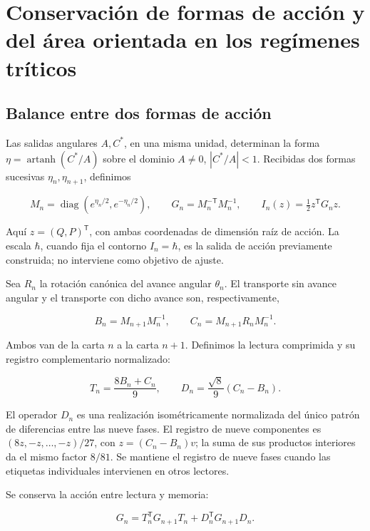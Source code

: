 \section{Conservación de formas de acción y del área orientada en los regímenes tríticos}
\label{nuclear:8}
\subsection{Balance entre dos formas de acción}

Las salidas angulares \(A,C^*\), en una misma unidad, determinan la forma \(\eta=\operatorname{artanh}(C^*/A)\) sobre el dominio \(A\ne0\), \(|C^*/A|<1\). Recibidas dos formas sucesivas \(\eta_n,\eta_{n+1}\), definimos

\[
M_n=\operatorname{diag}(e^{\eta_n/2},e^{-\eta_n/2}),\qquad
G_n=M_n^{-\mathsf T}M_n^{-1},\qquad
I_n(z)=\tfrac12z^\mathsf TG_nz.
\]

Aquí \(z=(Q,P)^\mathsf T\), con ambas coordenadas de dimensión raíz de acción. La escala \(\hbar\), cuando fija el contorno \(I_n=\hbar\), es la salida de acción previamente construida; no interviene como objetivo de ajuste.

Sea \(R_n\) la rotación canónica del avance angular \(\theta_n\). El transporte sin avance angular y el transporte con dicho avance son, respectivamente,

\begin{equation}
B_n=M_{n+1}M_n^{-1},\qquad
C_n=M_{n+1}R_nM_n^{-1}.
\label{nuc08:eq:1}
\end{equation}

Ambos van de la carta \(n\) a la carta \(n+1\). Definimos la lectura comprimida y su registro complementario normalizado:

\begin{equation}
T_n=\frac{8B_n+C_n}{9},\qquad
D_n=\frac{\sqrt8}{9}(C_n-B_n).
\label{nuc08:eq:2}
\end{equation}

El operador \(D_n\) es una realización isométricamente normalizada del único patrón de diferencias entre las nueve fases. El registro de nueve componentes es \((8z,-z,\ldots,-z)/27\), con \(z=(C_n-B_n)v\); la suma de sus productos interiores da el mismo factor \(8/81\). Se mantiene el registro de nueve fases cuando las etiquetas individuales intervienen en otros lectores.

\begin{theorem}
Se conserva la acción entre lectura y memoria:

\begin{equation}
\boxed{G_n=T_n^\mathsf TG_{n+1}T_n+D_n^\mathsf TG_{n+1}D_n.}
\label{nuc08:eq:3}
\end{equation}
\end{theorem}

